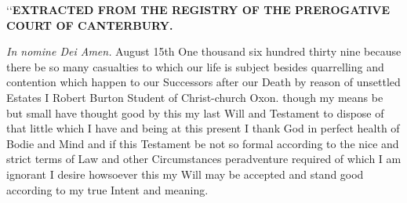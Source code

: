\documentclass[titlepage,12pt,a4]{octavo}
\begin{document}
{\scriptsize{}\lq\lq\textbf{EXTRACTED FROM THE REGISTRY OF THE PREROGATIVE COURT OF CANTERBURY.}

\emph{In nomine Dei Amen.} August 15th One thousand six hundred thirty nine because there be so many casualties to which our life is subject besides quarrelling and contention which happen to our Successors after our Death by reason of unsettled Estates I Robert Burton Student of Christ-church Oxon. though my means be but small have thought good by this my last Will and Testament to dispose of that little which I have and being at this present I thank God in perfect health of Bodie and Mind and if this Testament be not so formal according to the nice and strict terms of Law and other Circumstances peradventure required of which I am ignorant I desire howsoever this my Will may be accepted and stand good according to my true Intent and meaning.

}
\end{document}
